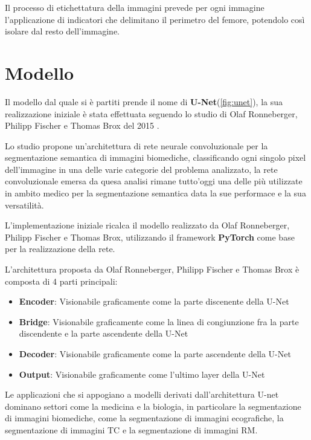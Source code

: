 Il processo di etichettatura della immagini prevede per ogni immagine
l'applicazione di indicatori che delimitano il perimetro del femore, potendolo
così isolare dal resto dell'immagine.





\section{Modello}

Il modello dal quale si è partiti prende il nome di
\textbf{U-Net}(\autoref{fig:unet}), la sua realizzazione iniziale è stata
effettuata seguendo lo studio di Olaf Ronneberger, Philipp Fischer e Thomas Brox
del 2015 \cite{ronneberger2015unet}.

Lo studio propone un'architettura di rete neurale convoluzionale per la
segmentazione semantica di immagini biomediche, classificando ogni singolo pixel
dell'immagine in una delle varie categorie del problema analizzato, la rete
convoluzionale emersa da quesa analisi rimane tutto'oggi una delle più
utilizzate in ambito medico per la segmentazione semantica data la sue
performace e la sua versatilità.

L'implementazione iniziale ricalca il modello realizzato da Olaf Ronneberger,
Philipp Fischer e Thomas Brox, utilizzando il framework \textbf{PyTorch}
\cite{pytorch} come base per la realizzazione della rete.



L'architettura proposta da Olaf Ronneberger, Philipp Fischer e Thomas Brox è
composta di 4 parti principali: \begin{itemize} \item \textbf{Encoder}:
Visionabile graficamente come la parte discenente della U-Net \item
\textbf{Bridge}: Visionabile graficamente come la linea di congiunzione fra la
parte discendente e la parte ascendente della U-Net \item \textbf{Decoder}:
Visionabile graficamente come la parte ascendente della U-Net \item
\textbf{Output}: Visionabile graficamente come l'ultimo layer della U-Net
\end{itemize}

Le applicazioni che si appogiano a modelli derivati dall'architettura U-net
dominano settori come la medicina e la biologia, in particolare la segmentazione
di immagini biomediche, come la segmentazione di immagini ecografiche, la
segmentazione di immagini TC e la segmentazione di immagini RM.

